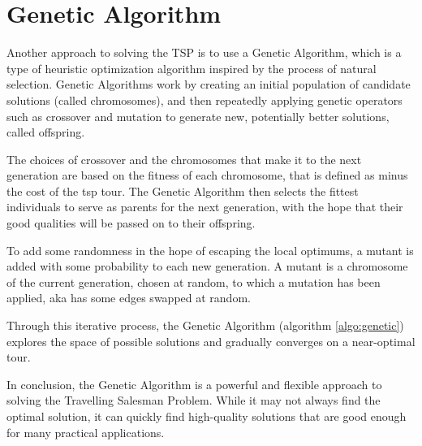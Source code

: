 	




\section{Genetic Algorithm}
Another approach to solving the TSP is to use a Genetic Algorithm, which is a type of heuristic optimization algorithm inspired by the process of natural selection. Genetic Algorithms work by creating an initial population of candidate solutions (called chromosomes), and then repeatedly applying genetic operators such as crossover and mutation to generate new, potentially better solutions, called offspring.


The choices of crossover and the chromosomes that make it to the next generation are based on the fitness of each chromosome, that is defined as minus the cost of the tsp tour. The Genetic Algorithm then selects the fittest individuals to serve as parents for the next generation, with the hope that their good qualities will be passed on to their offspring.

To add some randomness in the hope of escaping the local optimums, a mutant is added with some probability to each new generation. A mutant is a chromosome of the current generation, chosen at random, to which a mutation has been applied, aka has some edges swapped at random.

Through this iterative process, the Genetic Algorithm (algorithm \ref{algo:genetic}) explores the space of possible solutions and gradually converges on a near-optimal tour.

In conclusion, the Genetic Algorithm is a powerful and flexible approach to solving the Travelling Salesman Problem. While it may not always find the optimal solution, it can quickly find high-quality solutions that are good enough for many practical applications.


